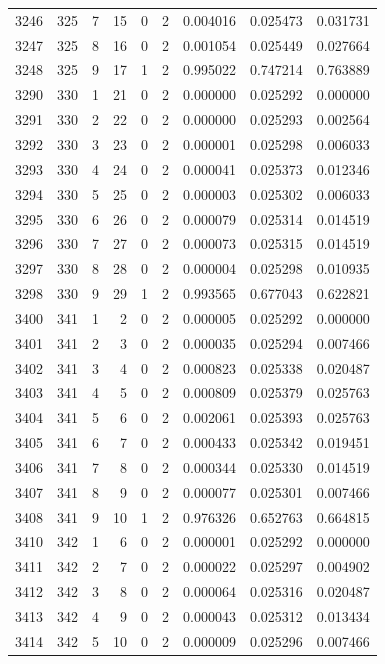\begin{longtable}{rrrrrrrrr}
3246 & 325 & 7 & 15 & 0 & 2 & 0.004016 & 0.025473 & 0.031731 \\
3247 & 325 & 8 & 16 & 0 & 2 & 0.001054 & 0.025449 & 0.027664 \\
3248 & 325 & 9 & 17 & 1 & 2 & 0.995022 & 0.747214 & 0.763889 \\
3290 & 330 & 1 & 21 & 0 & 2 & 0.000000 & 0.025292 & 0.000000 \\
3291 & 330 & 2 & 22 & 0 & 2 & 0.000000 & 0.025293 & 0.002564 \\
3292 & 330 & 3 & 23 & 0 & 2 & 0.000001 & 0.025298 & 0.006033 \\
3293 & 330 & 4 & 24 & 0 & 2 & 0.000041 & 0.025373 & 0.012346 \\
3294 & 330 & 5 & 25 & 0 & 2 & 0.000003 & 0.025302 & 0.006033 \\
3295 & 330 & 6 & 26 & 0 & 2 & 0.000079 & 0.025314 & 0.014519 \\
3296 & 330 & 7 & 27 & 0 & 2 & 0.000073 & 0.025315 & 0.014519 \\
3297 & 330 & 8 & 28 & 0 & 2 & 0.000004 & 0.025298 & 0.010935 \\
3298 & 330 & 9 & 29 & 1 & 2 & 0.993565 & 0.677043 & 0.622821 \\
3400 & 341 & 1 & 2 & 0 & 2 & 0.000005 & 0.025292 & 0.000000 \\
3401 & 341 & 2 & 3 & 0 & 2 & 0.000035 & 0.025294 & 0.007466 \\
3402 & 341 & 3 & 4 & 0 & 2 & 0.000823 & 0.025338 & 0.020487 \\
3403 & 341 & 4 & 5 & 0 & 2 & 0.000809 & 0.025379 & 0.025763 \\
3404 & 341 & 5 & 6 & 0 & 2 & 0.002061 & 0.025393 & 0.025763 \\
3405 & 341 & 6 & 7 & 0 & 2 & 0.000433 & 0.025342 & 0.019451 \\
3406 & 341 & 7 & 8 & 0 & 2 & 0.000344 & 0.025330 & 0.014519 \\
3407 & 341 & 8 & 9 & 0 & 2 & 0.000077 & 0.025301 & 0.007466 \\
3408 & 341 & 9 & 10 & 1 & 2 & 0.976326 & 0.652763 & 0.664815 \\
3410 & 342 & 1 & 6 & 0 & 2 & 0.000001 & 0.025292 & 0.000000 \\
3411 & 342 & 2 & 7 & 0 & 2 & 0.000022 & 0.025297 & 0.004902 \\
3412 & 342 & 3 & 8 & 0 & 2 & 0.000064 & 0.025316 & 0.020487 \\
3413 & 342 & 4 & 9 & 0 & 2 & 0.000043 & 0.025312 & 0.013434 \\
3414 & 342 & 5 & 10 & 0 & 2 & 0.000009 & 0.025296 & 0.007466 \\

\end{longtable}
